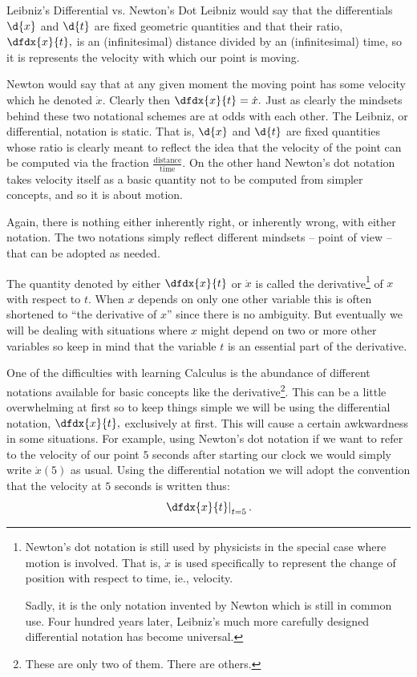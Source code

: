 \begin{mynotation}{Leibniz's Differential vs. Newton's Dot}
  Leibniz would say that the differentials $\d{x}$ and $\d{t}$ are
  fixed geometric quantities and that their ratio, $\dfdx{x}{t},$ is
  an (infinitesimal) distance divided by an (infinitesimal) time, so
  it is represents the velocity with which our point is moving.

  Newton would say that at any given moment the moving point has some
  velocity which he denoted $\dot{x}.$ Clearly then
  $\dfdx{x}{t}=\dot{x}.$ Just as clearly the mindsets behind these two
  notational schemes are at odds with each other. The Leibniz, or
  differential, notation is static. That is, $\d{x}$ and $\d{t}$ are
  fixed quantities whose ratio is clearly meant to reflect the idea
  that the velocity of the point can be computed via the fraction
  $\frac{\text{distance}}{\text{time}}.$ On the other hand Newton's
  dot notation takes velocity itself as a basic quantity not to be
  computed from simpler concepts, and so it is about motion.

  Again, there is nothing either inherently right, or inherently
  wrong, with either notation. The two notations simply reflect
  different mindsets -- point of view -- that can be adopted as
  needed.

  \begin{definition}{}
    The quantity denoted by either $\dfdx{x}{t}$ or $\dot{x}$ is
    called the derivative\footnote{Newton's dot notation is still
    used by physicists in the special case where motion is
    involved. That is, $\dot{x}$ is used specifically to represent the
    change of position with respect to time, ie., velocity.

    Sadly, it is the only notation invented by Newton which is still
    in common use. Four hundred years later, Leibniz's much more
    carefully designed differential notation has become universal. }
  of $x$ with respect to $t.$ When $x$ depends on only one other
  variable this is often shortened to ``the derivative of $x$''
  since there is no ambiguity. But eventually we will be dealing with
  situations where $x$ might depend on two or more other variables so
  keep in mind that the variable $t$ is an essential part of the
  derivative.
  \end{definition}

  One of the difficulties with learning Calculus is the abundance of
  different notations available for basic concepts like the
  derivative\footnote{These are only two of them. There are
    others.}. This can be a little overwhelming at first so to keep
  things simple we will be using the differential notation,
  $\dfdx{x}{t},$ exclusively at first. This will cause a certain
  awkwardness in some situations. For example, using Newton's dot
  notation if we want to refer to the velocity of our point $5$
  seconds after starting our clock we would simply write $\dot{x}(5)$
  as usual. Using the differential notation we will adopt the
  convention that the velocity at $5$ seconds is written thus:
$$
\left.\dfdx{x}{t}\right|_{t=5}.
$$


\end{mynotation}
